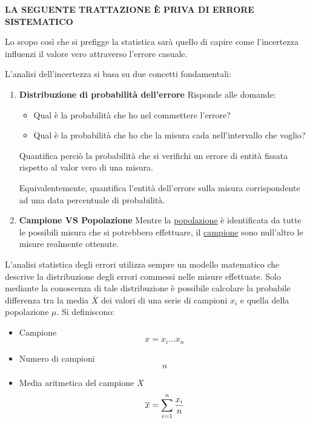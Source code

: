 \documentclass[a4paper, 15pt]{article}
\begin{document}
\begin{adjustwidth}{2in}{}
	 	 \begin{center}
	 	 	\textbf{LA SEGUENTE TRATTAZIONE È PRIVA DI ERRORE SISTEMATICO}\newline
	 	 \end{center} 
	 	 
	 	 Lo scopo così che si prefigge la statistica sarà quello di capire come l'incertezza influenzi il valore vero attraverso l'errore casuale. 
	 	 
	 	 L’analisi dell’incertezza si basa su due concetti fondamentali:
	 	 \begin{enumerate}
	 	 	\item \textbf{Distribuzione di probabilità dell'errore}\newline 
	 	 	Risponde alle domande:
	 	 	\begin{itemize}
	 	 		\item Qual è la probabilità che ho nel commettere l'errore?
	 	 		\item Qual è la probabilità che ho che la misura cada nell'intervallo che voglio?
	 	 	\end{itemize}
 	 	Quantifica perciò la probabilità che si verifichi un errore di entità fissata rispetto al valor vero di una misura.
 	 	
 	 	 Equivalentemente, quantifica l'entità dell'errore sulla misura corrispondente ad una data percentuale di probabilità.
 	 	 
 	 	 \item \textbf{Campione VS Popolazione} \newline 
 	 	 Mentre la \underline{popolazione} è identificata da tutte le possibili misura che si potrebbero effettuare, il \underline{campione} sono null'altro le misure realmente ottenute.
	 	 \end{enumerate}
 	 	L’analisi statistica degli errori utilizza sempre un modello matematico che descrive la distribuzione degli errori commessi nelle misure effettuate. Solo mediante la conoscenza di tale distribuzione è possibile calcolare la probabile differenza tra la media $\overline{X}$ dei valori di una serie di campioni $ x_i $ e quella della popolazione $\mu$. 
\newpage 	 	
 	 	Si definiscono:
 	 	\begin{itemize}
 	 		\item Campione
 	 		\[x = x_i \dots x_n\]
 	 		
 	 		\item Numero di campioni 
 	 			 	\[n\]
 	 			 	
 	 		\item Media aritmetica del campione $X$
 	 			 	\[\overline{x} = \sum_{i=1}^{n}{x_i\over n}\]
 	 			 	

\end{itemize}
\end{adjustwidth}
\end{document}
